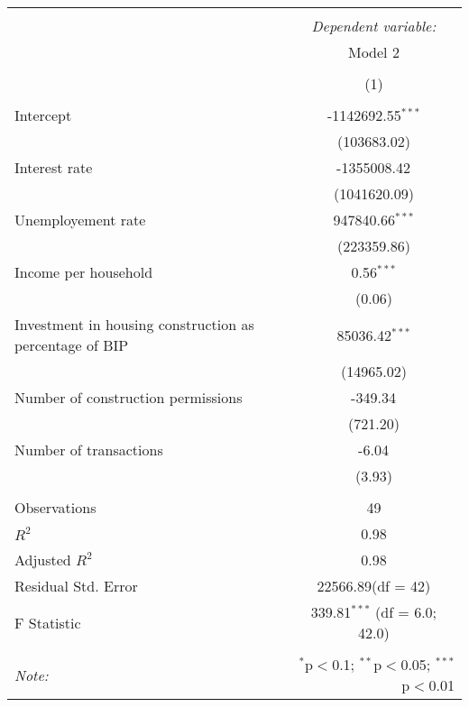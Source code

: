 \begin{table}[!htbp] \centering
\begin{tabular}{@{\extracolsep{5pt}}lc}
\\[-1.8ex]\hline
\hline \\[-1.8ex]
& \multicolumn{1}{c}{\textit{Dependent variable:}} \
\cr \cline{1-2}
\\[-1.8ex] & \multicolumn{1}{c}{Model 2} \\\\[-1.8ex] & (1) \\
\hline \\[-1.8ex]
 Intercept & -1142692.55$^{***}$ \\
  & (103683.02) \\
 Interest rate & -1355008.42$^{}$ \\
  & (1041620.09) \\
 Unemployement rate & 947840.66$^{***}$ \\
  & (223359.86) \\
 Income per household & 0.56$^{***}$ \\
  & (0.06) \\
 Investment in housing construction as percentage of BIP & 85036.42$^{***}$ \\
  & (14965.02) \\
 Number of construction permissions & -349.34$^{}$ \\
  & (721.20) \\
 Number of transactions & -6.04$^{}$ \\
  & (3.93) \\
\hline \\[-1.8ex]
 Observations & 49 \\
 $R^2$ & 0.98 \\
 Adjusted $R^2$ & 0.98 \\
 Residual Std. Error & 22566.89(df = 42)  \\
 F Statistic & 339.81$^{***}$ (df = 6.0; 42.0) \\
\hline
\hline \\[-1.8ex]
\textit{Note:} & \multicolumn{1}{r}{$^{*}$p$<$0.1; $^{**}$p$<$0.05; $^{***}$p$<$0.01} \\
\end{tabular}
\end{table}